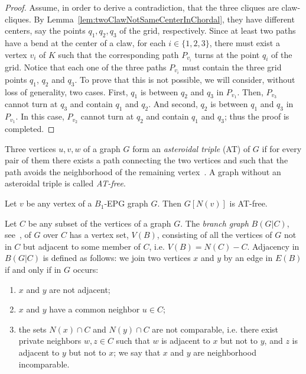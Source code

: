 \begin{proof}
Assume, in order to derive a contradiction, that the three cliques are claw-cliques. By Lemma~\ref{lem:twoClawNotSameCenterInChordal}, they have different centers, say the points $q_1, q_2, q_3$ of the grid, respectively. Since at least two paths have a bend at the center of a claw, for each $i\in\{1,2,3\}$,   there must exist a vertex
  $v_i$ of $K$ such that the corresponding path $P_{v_i}$ turns at the point $q_i$ of the grid.  Notice that each one of the three paths $P_{v_i}$
  must contain  the three grid points $q_1$, $q_2$ and $q_3$. To prove that this is not possible, we will consider, without loss of generality, two cases.
  First,  $q_1$ is between $q_2$ and $q_3$ in $P_{v_1}$. Then, $P_{v_3}$ cannot turn at $q_3$ and contain $q_1$ and $q_2$.   And second,
  $q_2$ is between $q_1$ and $q_3$ in $P_{v_1}$. In this case, $P_{v_2}$ cannot turn at $q_2$ and contain $q_1$ and $q_3$; thus the proof is completed.
 
\end{proof}

Three vertices $u, v, w$ of a graph $G$ form an \textit{asteroidal triple} (AT) of $G$ if for every pair of them there exists a path connecting the two vertices and such that the path avoids the neighborhood of the remaining vertex~\cite{Asinowski2009}. A graph without an asteroidal triple is called \textit{AT-free}. 

\begin{lema}
 \label{l:AT-free} Let $v$ be any vertex of a $B_1$-EPG graph $G$. Then $G[N(v)]$ is AT-free.
\end{lema}

Let $C$ be any subset of the vertices of a graph $G$. The \textit{branch graph} $B(G|C)$, see~\cite{golumbic2009}, of $G$ over $C$ has a vertex set, $V(B)$, consisting of all the vertices of $G$ not in $C$ but adjacent to some member of $C$, i.e. $V(B) = N(C) - C$. Adjacency in $B(G|C)$ is defined as follows: we join two vertices $x$ and $y$ by an edge in $E(B)$ if and only if in $G$ occurs:
\begin{enumerate}
    \item  $x$ and $y$ are not adjacent;
    \item $x$ and $y$ have a common neighbor $u \in C$;
    \item the sets $N(x) \cap C$ and $N(y) \cap C$ are not comparable, i.e. there exist private neighbors $w, z \in C$ such that $w$ is adjacent to $x$ but not to $y$, and $z$ is adjacent to $y$ but not to $x$; we say that $x$ and $y$ are neighborhood incomparable.
\end{enumerate}

